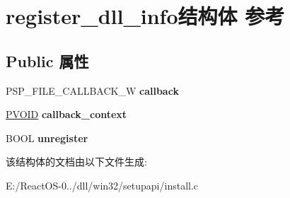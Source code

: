 \hypertarget{structregister__dll__info}{}\section{register\+\_\+dll\+\_\+info结构体 参考}
\label{structregister__dll__info}
\subsection*{Public 属性}
\begin{DoxyCompactItemize}
\item 
\mbox{\label{structregister__dll__info_a28129b3e0ec9dfbcd6f10afbccf6ec08}} 
P\+S\+P\+\_\+\+F\+I\+L\+E\+\_\+\+C\+A\+L\+L\+B\+A\+C\+K\+\_\+W {\bfseries callback}
\item 
\mbox{\label{structregister__dll__info_a66fec1f7ea1004b16636802e2940e2a6}} 
\hyperlink{interfacevoid}{P\+V\+O\+ID} {\bfseries callback\+\_\+context}
\item 
\mbox{\label{structregister__dll__info_abf2de3bce80d16b8edc48a1ac692c821}} 
B\+O\+OL {\bfseries unregister}
\end{DoxyCompactItemize}


该结构体的文档由以下文件生成\+:\begin{DoxyCompactItemize}
\item 
E\+:/\+React\+O\+S-\/0../dll/win32/setupapi/install.\+c\end{DoxyCompactItemize}
